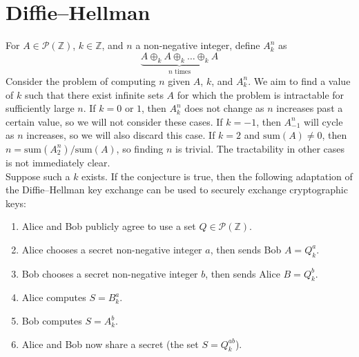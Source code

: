 \documentclass{article}
\newcommand{\zee}{\mathbb{Z}}
\newcommand{\sumt}{\text{sum}}
\begin{document}
\section{Diffie--Hellman}

For $A \in \mathcal{P}(\zee)$, $k \in \zee$, and $n$ a non-negative integer,
define $A_k^n$ as
\[\underbrace{A \oplus_k A \oplus_k \ldots \oplus_k A}_{n\text{ times}}\]
Consider the problem of computing $n$ given $A$, $k$, and $A_k^n$.
We aim to find a value of $k$ such that there exist infinite sets
$A$ for which the problem is intractable for sufficiently large $n$.
If $k = 0$ or $1$, then $A_k^n$ does not change as $n$ increases
past a certain value, so we will not consider these cases. If $k = -1$,
then $A_{-1}^n$ will cycle as $n$ increases, so we will also discard this
case. If $k = 2$ and $\sumt(A) \neq 0$, then $n = \sumt(A_2^n) / \sumt(A)$,
so finding $n$ is trivial. The tractability in other cases is not
immediately clear.
\\[0.5em]
Suppose such a $k$ exists. If the conjecture is true, then the following
adaptation of the Diffie--Hellman key exchange can be used to securely
exchange cryptographic keys:
\begin{enumerate}
    \item Alice and Bob publicly agree to use a set
    $Q \in \mathcal{P}(\zee)$.
    \item Alice chooses a secret non-negative integer $a$, then sends Bob
    $A = Q_k^a$.
    \item Bob chooses a secret non-negative integer $b$, then sends Alice
    $B = Q_k^b$.
    \item Alice computes $S = B_k^a$.
    \item Bob computes $S = A_k^b$.
    \item Alice and Bob now share a secret (the set $S = Q_k^{ab}$).
\end{enumerate}
\end{document}
